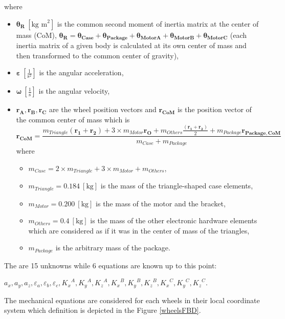 \documentclass[12pt,english]{article}
\begin{document}
where \begin{itemize}
	\item $\boldsymbol{\theta_R}~[\text{kg m}^2]$ is the common second moment of inertia matrix at the center of mass (CoM), $\boldsymbol{\theta_R} = \boldsymbol{\theta_{Case}} +\boldsymbol{\theta_{Package}} + \boldsymbol{\theta_{MotorA}} + \boldsymbol{\theta_{MotorB}} + \boldsymbol{\theta_{MotorC}} $ (each inertia matrix of a given body is calculated at its own center of mass and then transformed to the common  center of gravity),
	\item $\boldsymbol{\varepsilon}~[\frac{1}{\text{s}^2}]$ is the angular acceleration,
	\item $\boldsymbol{\omega}~[\frac{1}{\text{s}}]$ is the angular velocity,
	\item $\mathbf{r_A},\mathbf{r_B},\mathbf{r_C}$ are the wheel position vectors and $\mathbf{r_{CoM}}$ is the position vector of the common center of mass which is
	\begin{equation}
		\mathbf{r_{CoM}} = 
			\frac{
				m_{Triangle} (\mathbf{r_1}+\mathbf{r_2})		+
				3 \times m_{Motor} \mathbf{r_O}					+
				m_{Others} \frac{(\mathbf{r_1}+\mathbf{r_2})}{2} 			+ 
				m_{Package}
				\mathbf{r_{Package,CoM}}
			}{
				m_{Case}+m_{Package}
		}
	\end{equation}
	where \begin{itemize}
		\item $m_{Case} = 2 \times m_{Triangle} + 3 \times m_{Motor} + m_{Others}$,
		\item $m_{Triangle} = 0.184~[\text{kg}]$ is the mass of the triangle-shaped case elements,
		\item $m_{Motor} = 0.200~[\text{kg}]$ is the mass of the motor and the bracket,
		\item $m_{Others} = 0.4~[\text{kg}]$ is the mass of the other electronic hardware elements which are considered as if it was in the center of mass of the triangles,
		\item $m_{Package}$ is the arbitrary mass of the package.
	\end{itemize}
\end{itemize}
The are 15 unknowns while 6 equations are known up to this point: \begin{center}
	$a_x,a_y,a_z,\varepsilon_a,\varepsilon_b,\varepsilon_c,{K_x}^A,{K_y}^A,{K_z}^A,{K_x}^B,{K_y}^B,{K_z}^B,{K_x}^C,{K_y}^C,{K_z}^C$.
\end{center}
The mechanical equations are considered for each wheels in their local coordinate system which definition is depicted in the Figure \ref{wheelsFBD}. 
\end{document}
